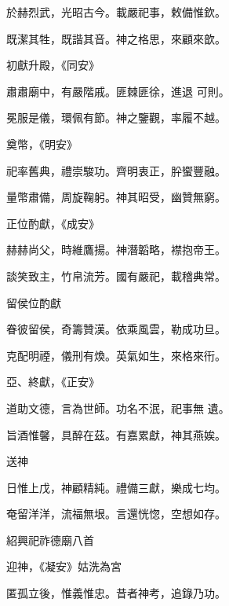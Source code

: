 \begin{pinyinscope}
 於赫烈武，光昭古今。載嚴祀事，敕備惟欽。



 既潔其牲，既諧其音。神之格思，來顧來歆。



 初獻升殿，《同安》



 肅肅廟中，有嚴階戚。匪棘匪徐，進退
 可則。



 冕服是儀，環佩有節。神之鑒觀，率履不越。



 奠幣，《明安》



 祀率舊典，禮崇駿功。齊明衷正，肸蠁豐融。



 量幣肅備，周旋鞠躬。神其昭受，幽贊無窮。



 正位酌獻，《成安》



 赫赫尚父，時維鷹揚。神潛韜略，襟抱帝王。



 談笑致主，竹帛流芳。國有嚴祀，載稽典常。



 留侯位酌獻



 眷彼留侯，奇籌贊漢。依乘風雲，勒成功旦。



 克配明禋，儀刑有煥。英氣如生，來格來衎。



 亞、終獻，《正安》



 道助文德，言為世師。功名不泯，祀事無
 遺。



 旨酒惟馨，具醉在茲。有嘉累獻，神其燕娭。



 送神



 日惟上戊，神顧精純。禮備三獻，樂成七均。



 奄留洋洋，流福無垠。言還恍惚，空想如存。



 紹興祀祚德廟八首



 迎神，《凝安》姑洗為宮



 匿孤立後，惟義惟忠。昔者神考，追錄乃功。




\end{pinyinscope}
